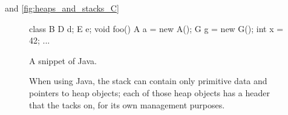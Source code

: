 and
\autoref{fig:heaps_and_stacks_C}

  
\begin{figure}
\begin{subfloat}
\begin{minipage}[b]{0.4\textwidth}
\begin{shortlisting}
class B {
  D d;
  E e;
}
void foo() {
  A a = new A();
  G g = new G();
  int x = 42;
  ...
}
\end{shortlisting}
\end{minipage}
\caption{A snippet of Java.}
\end{subfloat}
	 \caption{When using Java,
	the stack can
	contain only primitive data and pointers to heap objects; each of those heap
	objects has a header that the \jre tacks on, for its own management
	purposes.}
\end{figure}

